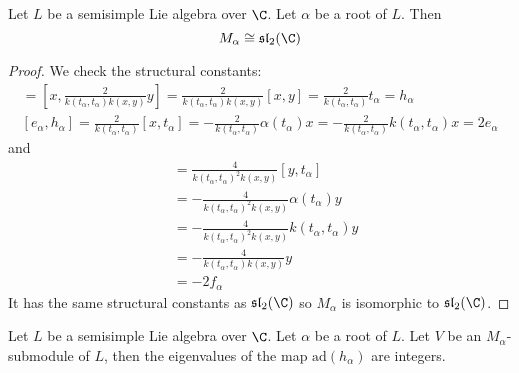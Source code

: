 \documentclass[a4paper]{article}
\begin{document}
\begin{prp}{}{} Let $L$ be a semisimple Lie algebra over $\C$. Let $\alpha$ be a root of $L$. Then $$M_\alpha\cong\mathfrak{sl}_2(\C)$$ \tcbline
\begin{proof}
We check the structural constants: 
\begin{align*}
[e_\alpha,f_\alpha]=\left[x,\frac{2}{k(t_\alpha,t_\alpha)k(x,y)}y\right]=\frac{2}{k(t_\alpha,t_\alpha)k(x,y)}[x,y]=\frac{2}{k(t_\alpha,t_\alpha)}t_\alpha=h_\alpha\\
[e_\alpha,h_\alpha]=\frac{2}{k(t_\alpha,t_\alpha)}[x,t_\alpha]=-\frac{2}{k(t_\alpha,t_\alpha)}\alpha(t_\alpha)x=-\frac{2}{k(t_\alpha,t_\alpha)}k(t_\alpha,t_\alpha)x=2e_\alpha
\end{align*} and 
\begin{align*}
[f_\alpha,h_\alpha]&=\frac{4}{k(t_\alpha,t_\alpha)^2k(x,y)}[y,t_\alpha]\\
&=-\frac{4}{k(t_\alpha,t_\alpha)^2k(x,y)}\alpha(t_\alpha)y\\
&=-\frac{4}{k(t_\alpha,t_\alpha)^2k(x,y)}k(t_\alpha,t_\alpha)y\\
&=-\frac{4}{k(t_\alpha,t_\alpha)k(x,y)}y\\
&=-2f_\alpha
\end{align*}
It has the same structural constants as $\mathfrak{sl}_2(\C)$ so $M_\alpha$ is isomorphic to $\mathfrak{sl}_2(\C)$. 
\end{proof}
\end{prp}

\begin{prp}{}{} Let $L$ be a semisimple Lie algebra over $\C$. Let $\alpha$ be a root of $L$. Let $V$ be an $M_\alpha$-submodule of $L$, then the eigenvalues of the map $\text{ad}(h_\alpha)$ are integers. 
\end{prp}
\end{document}
